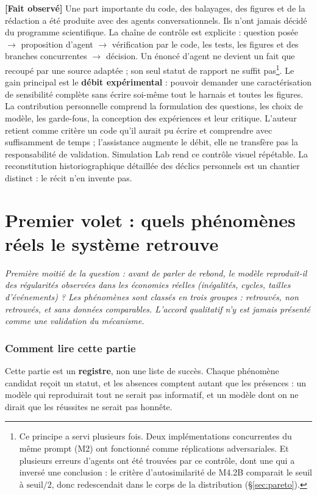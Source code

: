 \documentclass[11pt,a4paper]{article}
\newcommand{\fait}{\textbf{[Fait observé]}}
\begin{document}
\fait{} Une part importante du code, des balayages, des figures et de la
rédaction a été produite avec des agents conversationnels. Ils n'ont jamais
décidé du programme scientifique. La chaîne de contrôle est explicite :
question posée $\rightarrow$ proposition d'agent $\rightarrow$ vérification par
le code, les tests, les figures et des branches concurrentes $\rightarrow$
décision. Un énoncé d'agent ne devient un fait que recoupé par une source
adaptée ; son seul statut de rapport ne suffit pas\footnote{Ce principe a servi
plusieurs fois. Deux implémentations concurrentes du même prompt (M2) ont
fonctionné comme réplications adversariales. Et plusieurs erreurs d'agents ont
été trouvées par ce contrôle, dont une qui a inversé une conclusion : le
critère d'autosimilarité de M4.2B comparait le seuil à $\text{seuil}/2$, donc
redescendait dans le corps de la distribution (§\ref{sec:pareto}).}. Le gain
principal est le \textbf{débit expérimental} : pouvoir demander une
caractérisation de sensibilité complète sans écrire soi-même tout le harnais et
toutes les figures.
La contribution personnelle comprend la formulation des questions, les choix
de modèle, les garde-fous, la conception des expériences et leur critique.
L'auteur retient comme critère un code qu'il aurait pu écrire et comprendre
avec suffisamment de temps ; l'assistance augmente le débit, elle ne
transfère pas la responsabilité de validation. Simulation Lab rend ce contrôle
visuel répétable. La reconstitution historiographique détaillée des déclics
personnels est un chantier distinct : le récit n'en invente pas.

\clearpage
\part{Premier volet : quels phénomènes réels le système retrouve}
\label{part:phenomenes}

\emph{Première moitié de la question : avant de parler de rebond, le modèle reproduit-il
des régularités observées dans les économies réelles (inégalités, cycles, tailles
d'événements) ? Les phénomènes sont classés en trois groupes : retrouvés, non
retrouvés, et sans données comparables. L'accord qualitatif n'y est jamais présenté
comme une validation du mécanisme.}

\section{Comment lire cette partie}

Cette partie est un \textbf{registre}, non une liste de succès. Chaque
phénomène candidat reçoit un statut, et les absences comptent autant que les
présences : un modèle qui reproduirait tout ne serait pas informatif, et un
modèle dont on ne dirait que les réussites ne serait pas honnête.
\end{document}
